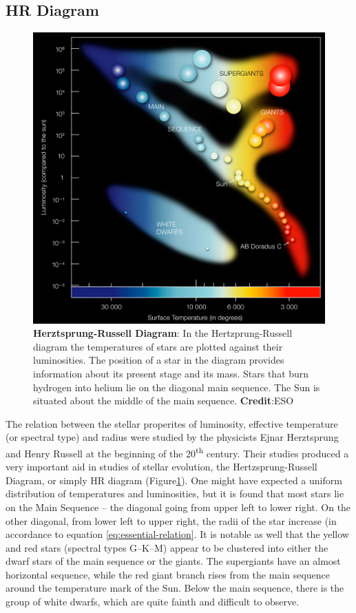 \subsection{HR Diagram}

\begin{figure}[hbt!]
		\centering
		\includegraphics[width=\textwidth]{img/hz-diagram-eso0728c}%
  		\caption{\textbf{Herztsprung-Russell Diagram}: 
  		In the Hertzprung-Russell diagram the temperatures of stars are plotted against their luminosities. The position of a star in the diagram provides information about its present stage and its mass. Stars that burn hydrogen into helium lie on the diagonal main sequence. The Sun is situated about the middle of the main sequence. \textbf{Credit}:ESO}
  		\label{fig:hr-diagram}
\end{figure}

The relation between the stellar properites of luminosity, effective temperature (or spectral type) and radius were studied by the physicists Ejnar Herztsprung and Henry Russell at the beginning of the 20\textsuperscript{th} century. Their studies produced a very important aid in studies of stellar evolution, the Hertzsprung-Russell Diagram, or simply HR diagram (Figure\ref{fig:hr-diagram}). One might have expected a uniform distribution of temperatures and luminosities, but it is found that most stars lie on the Main Sequence -- the diagonal going from upper left to lower right. On the other diagonal, from lower left to upper right, the radii of the star increase (in accordance to equation \ref{eq:essential-relation}. It is notable as well that the yellow and red stars (spectral types G–K–M) appear to be clustered into either the dwarf stars of the main
sequence or the giants. The supergiants have an almost horizontal sequence, while the red giant branch rises from the main sequence around the temperature mark of the Sun. Below the main sequence, there is the group of white dwarfs, which are quite fainth and difficult to observe.

